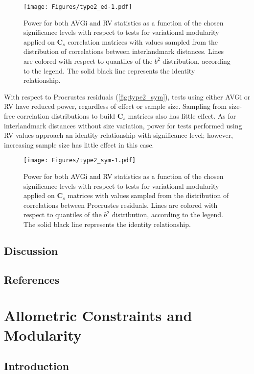 \documentclass[11pt,twoside]{report}
\begin{document}
\begin{figure}[htbp]
\centering
\texttt{[image: Figures/type2\_ed-1.pdf]}
\caption{Power for both AVGi and RV statistics as a function of the
chosen significance levels with respect to tests for variational
modularity applied on $\mathbf{C}_s$ correlation matrices with values
sampled from the distribution of correlations between interlandmark
distances. Lines are colored with respect to quantiles of the $b^2$
distribution, according to the legend. The solid black line represents
the identity relationship. \label{fig:type2_ed}}
\end{figure}

With respect to Procrustes residuals (\autoref{fig:type2_sym}), tests
using either AVGi or RV have reduced power, regardless of effect or
sample size. Sampling from size-free correlation distributions to build
$\mathbf{C}_s$ matrices also has little effect. As for interlandmark
distances without size variation, power for tests performed using RV
values approach an identity relationship with significance level;
however, increasing sample size has little effect in this case.

\begin{figure}[htbp]
\centering
\texttt{[image: Figures/type2\_sym-1.pdf]}
\caption{Power for both AVGi and RV statistics as a function of the
chosen significance levels with respect to tests for variational
modularity applied on $\mathbf{C}_s$ matrices with values sampled from
the distribution of correlations between Procrustes residuals. Lines are
colored with respect to quantiles of the $b^2$ distribution, according
to the legend. The solid black line represents the identity
relationship. \label{fig:type2_sym}}
\end{figure}

\section{Discussion}\label{discussion}

\section{References}\label{references}

\newpage
\chapter{Allometric Constraints and Modularity}
\label{ch:allo}

\section{Introduction}\label{introduction-1}
\end{document}
